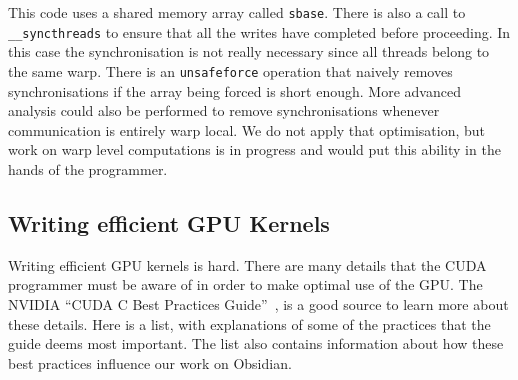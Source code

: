 \documentclass[a4paper]{book}
\begin{document}
\noindent This code uses a shared memory array called {\tt sbase}. There 
is also a call to \\ {\tt \_\_syncthreads} to ensure that all the writes have 
completed before proceeding. In this case the synchronisation is not really
necessary since all threads belong to the same warp. There is an {\tt unsafeforce} 
operation that naively removes synchronisations if the array being forced is short 
enough. More advanced analysis could also be performed to remove synchronisations 
whenever communication is entirely warp local. We do not apply that optimisation, 
but work on warp level computations is in progress and would put this ability 
in the hands of the programmer.  

\FloatBarrier 
\subsection{Writing efficient GPU Kernels} 
\label{sec:efficient}
 
Writing efficient GPU kernels is hard. There are many details that the CUDA 
programmer must be aware of in order to make optimal use of the GPU. 
The NVIDIA ``CUDA C Best Practices Guide''~\citet{BestPrac}, is a good source 
to learn more about these details. Here is a list, with explanations of some 
of the practices that the guide deems most important. The list also contains 
information about how these best practices influence our work on Obsidian.  
  
\end{document}
